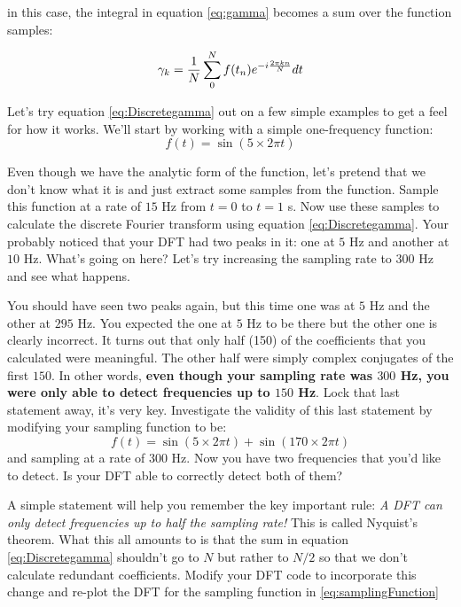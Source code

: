 in this case, the integral in equation \ref{eq:gamma} becomes a sum
over the function samples:

\begin{equation}\label{eq:Discretegamma}
\gamma_k = {1 \over N} \sum_0^N f(t_n) e^{-i
  \frac{2 \pi k n}{N}}dt 
\end{equation}

\begin{enumerate}
\probtwo Let's try equation \ref{eq:Discretegamma} out on a few simple
examples to get a feel for how it works.  We'll start by working with
a simple one-frequency function:
\begin{equation}\label{eq:samplingFunction}
f(t) = \sin(5 \times 2 \pi t)
\end{equation}
\begin{enumerate}
\subprob Even though we have the analytic form of the function, let's
pretend that we don't know what it is and just extract some samples
from the function.  Sample this function at a rate of $15$ Hz from $t
= 0$ to $t = 1$ s.  
\subprob Now use these samples to calculate the discrete
Fourier transform using equation \ref{eq:Discretegamma}.  
\subprob Your probably noticed that your DFT had two peaks in it: one at $5$ Hz
and another at $10$ Hz.  What's going on here?   Let's try increasing
the sampling rate to $300$ Hz and see what happens.

You should have seen two peaks again, but this time one was at $5$ Hz
and the other at $295$
Hz.  You expected the one at $5$ Hz to be there but the other one is
clearly incorrect.  It turns out that only half (150) of the coefficients
that you calculated were meaningful.  The other half were simply
complex conjugates of the first $150$.  In other words, \textbf{even though
your sampling rate was $300$ Hz, you were only able to detect
frequencies up to $150$ Hz}. Lock that last statement away, it's very key.
\subprob  Investigate the validity of this last statement by modifying
your sampling function to be:
\begin{equation}\label{eq:samplingFunction}
f(t) = \sin(5 \times 2 \pi t) + \sin(170 \times 2 \pi t)
\end{equation}
and sampling at a rate of $300$ Hz.  Now you have two frequencies that
you'd like to detect.  Is your DFT able to correctly detect both
of them?

A simple statement will help you remember the key important rule:
\textit{A DFT can only detect frequencies up to half the sampling
  rate!} This is called Nyquist's theorem.
\subprob  What this all amounts to is that the sum in equation
\ref{eq:Discretegamma} shouldn't go to $N$ but rather to $N/2$
so that we don't calculate redundant coefficients.  Modify your DFT
code to incorporate this change and re-plot the DFT for the sampling
function in \ref{eq:samplingFunction}


\end{enumerate}
\end{enumerate}
